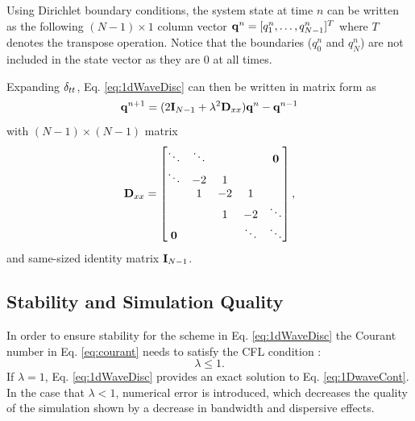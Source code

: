 \documentclass[fleqn]{jaes}
\def\SBcomment[#1]{\textcolor{red}{#1}}
\def\SWcomment[#1]{\textcolor{blue}{#1}}
\begin{document}
Using Dirichlet boundary conditions, the system state at time $n$ can be written as the following $(N-1) \times 1$ column vector $\mathbf{q}^n = [q_1^n, \hdots, q_{N-1}^n]^T$ where $T$ denotes the transpose operation. Notice that the boundaries ($q_0^n$ and $q_N^n$) are not included in the state vector as they are 0 at all times.

Expanding $\delta_{tt}$, Eq. \eqref{eq:1dWaveDisc} can then be written in matrix form as
\begin{equation}
    \mathbf{q}^{n+1} = (2 \mathbf{I}_{N-1} + \lambda^2 \mathbf{D}_{xx})\mathbf{q}^n - \mathbf{q}^{n-1}
\end{equation}
with $(N-1)\times(N-1)$ matrix
\begin{equation}\label{eq:dxxMat}
    \Dxx =
    \begin{bmatrix}
        \ddots & \ddots & & &\mathbf{0}\\
        \ddots & -2 & 1 & & \\
        & 1 & -2 & 1 & \\
        & & 1 & -2 & \ddots \\
        \mathbf{0}& & & \ddots & \ddots 
    \end{bmatrix},
\end{equation}
and same-sized identity matrix $\mathbf{I}_{N-1}$. 


\subsection{Stability and Simulation Quality}\label{sec:quality}
In order to ensure stability for the scheme in Eq. \eqref{eq:1dWaveDisc} the Courant number in Eq. \eqref{eq:courant} needs to satisfy the CFL condition \cite{Courant1928}:
\begin{equation}\label{eq:CFL}
    \lambda \leq 1.
\end{equation}
%
If $\lambda = 1$, Eq. \eqref{eq:1dWaveDisc} provides an exact solution to Eq. \eqref{eq:1DwaveCont}. In the case that $\lambda < 1$, numerical error is introduced, which decreases the quality of the simulation shown by a decrease in bandwidth and dispersive effects.
\end{document}
